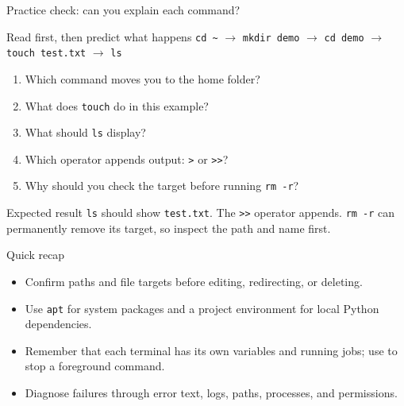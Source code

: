 \documentclass[aspectratio=169,10pt]{beamer}
\newcommand{\key}[1]{\fcolorbox{blue!30}{paper}{\strut\texttt{#1}}}
\newcommand{\term}[1]{\texttt{#1}}
\begin{document}
\begin{frame}[shrink=2]{Practice check: can you explain each command?}
  \begin{block}{Read first, then predict what happens}
    \centering\term{cd \textasciitilde{}} \;\(\rightarrow\)\; \term{mkdir demo} \;\(\rightarrow\)\; \term{cd demo} \;\(\rightarrow\)\; \term{touch test.txt} \;\(\rightarrow\)\; \term{ls}
  \end{block}
  \begin{enumerate}
    \item Which command moves you to the home folder?
    \item What does \term{touch} do in this example?
    \item What should \term{ls} display?
    \item Which operator appends output: \term{>} or \term{>>}?
    \item Why should you check the target before running \term{rm -r}?
  \end{enumerate}
  \begin{exampleblock}{Expected result}
    \term{ls} should show \term{test.txt}. The \term{>>} operator appends. \term{rm -r} can permanently remove its target, so inspect the path and name first.
  \end{exampleblock}
\end{frame}

\begin{frame}{Quick recap}
  \begin{center}
  \end{center}
  \begin{itemize}
    \item Confirm paths and file targets before editing, redirecting, or deleting.
    \item Use \term{apt} for system packages and a project environment for local Python dependencies.
    \item Remember that each terminal has its own variables and running jobs; use \key{Ctrl+C} to stop a foreground command.
    \item Diagnose failures through error text, logs, paths, processes, and permissions.
  \end{itemize}
\end{frame}
\end{document}
